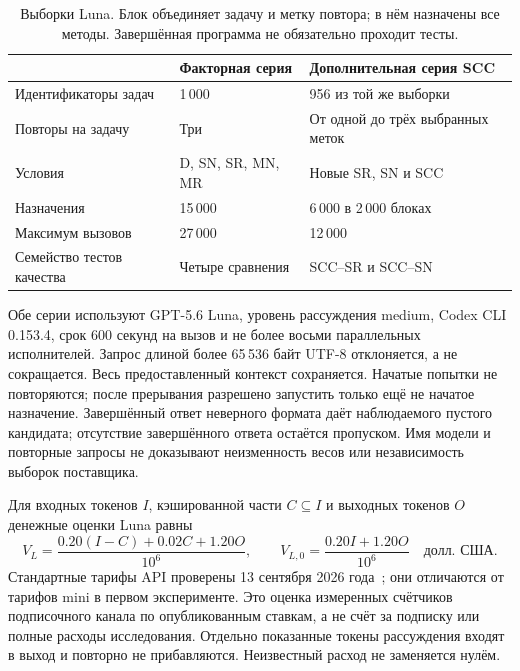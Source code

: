 \begin{table}[htbp]\centering\small
\caption{Выборки Luna. Блок объединяет задачу и метку повтора; в нём назначены все методы. Завершённая программа не обязательно проходит тесты.}
\begin{tabularx}{\textwidth}{@{}lXX@{}}\toprule
 & Факторная серия & Дополнительная серия SCC\\\midrule
Идентификаторы задач & 1\,000 & 956 из той же выборки\\
Повторы на задачу & Три & От одной до трёх выбранных меток\\
Условия & D, SN, SR, MN, MR & Новые SR, SN и SCC\\
Назначения & 15\,000 & 6\,000 в 2\,000 блоках\\
Максимум вызовов & 27\,000 & 12\,000\\
Семейство тестов качества & Четыре сравнения & SCC--SR и SCC--SN\\\bottomrule
\end{tabularx}\end{table}

Обе серии используют GPT-5.6 Luna, уровень рассуждения medium, Codex CLI 0.153.4, срок 600 секунд на вызов и не более восьми параллельных исполнителей. Запрос длиной более 65\,536 байт UTF-8 отклоняется, а не сокращается. Весь предоставленный контекст сохраняется. Начатые попытки не повторяются; после прерывания разрешено запустить только ещё не начатое назначение. Завершённый ответ неверного формата даёт наблюдаемого пустого кандидата; отсутствие завершённого ответа остаётся пропуском. Имя модели и повторные запросы не доказывают неизменность весов или независимость выборок поставщика.

Для входных токенов $I$, кэшированной части $C\subseteq I$ и выходных токенов $O$ денежные оценки Luna равны
\[
V_L=\frac{0.20(I-C)+0.02C+1.20O}{10^6},\qquad
V_{L,0}=\frac{0.20I+1.20O}{10^6}\quad\text{долл. США}.
\]
Стандартные тарифы API проверены 13 сентября 2026 года~\cite{openaipricing2026}; они отличаются от тарифов mini в первом эксперименте. Это оценка измеренных счётчиков подписочного канала по опубликованным ставкам, а не счёт за подписку или полные расходы исследования. Отдельно показанные токены рассуждения входят в выход и повторно не прибавляются. Неизвестный расход не заменяется нулём.

